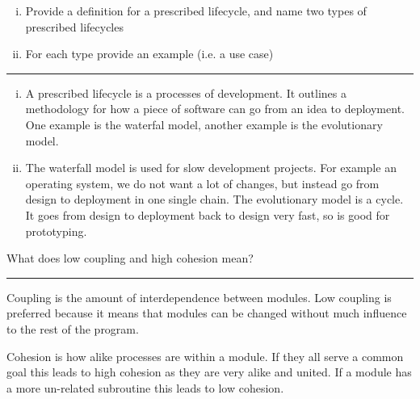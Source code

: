 \documentclass[11pt]{article}
\begin{document}
\begin{enumerate}[i.]
	\item Provide a definition for a prescribed lifecycle, and name two types of prescribed lifecycles
	\item For each type provide an example (i.e. a use case)
\end{enumerate}
\hrule

\begin{enumerate}[i.]
	\item A prescribed lifecycle is a processes of development. It outlines a methodology for how a piece of software can go from an idea to deployment. One example is the waterfal model, another example is the evolutionary model.
	\item The waterfall model is used for slow development projects. For example an operating system, we do not want a lot of changes, but instead go from design to deployment in one single chain. The evolutionary model is a cycle. It goes from design to deployment back to design very fast, so is good for prototyping. 
\end{enumerate}




What does low coupling and high cohesion mean?
\hrule

Coupling is the amount of interdependence between modules. Low coupling is preferred because it means that modules can be changed without much influence to the rest of the program. 

Cohesion is how alike processes are within a module. If they all serve a common goal this leads to high cohesion as they are very alike and united. If a module has a more un-related subroutine this leads to low cohesion.
\cite{post,geeks}







\end{document}
